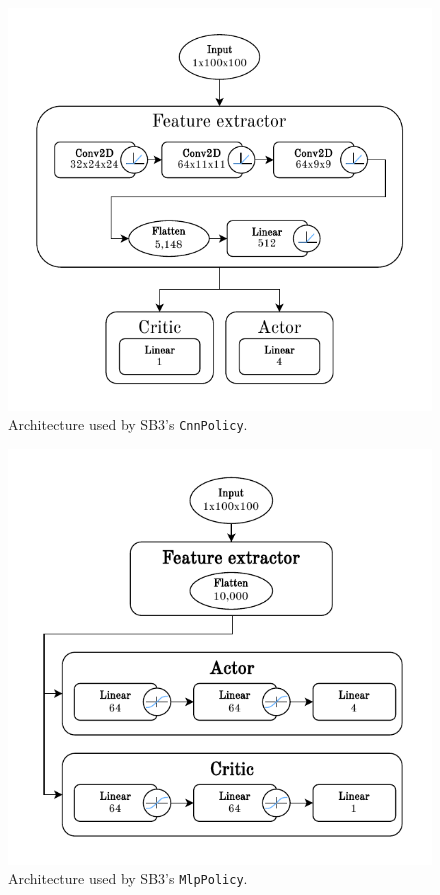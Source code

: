 \documentclass[
  digital,     %
  oneside,     %
  nosansbold,  %
  nocolorbold, %
  lof,         %
  lot,         %
]{fithesis4}
\begin{document}
\begin{figure}
    \includegraphics[width=1\linewidth]{diagrams/cnn_arch.pdf}
    \caption{Architecture used by SB3's \texttt{CnnPolicy}.}
    \label{fig:cnn_policy}
\end{figure}

\begin{figure}
    \includegraphics[width=1\linewidth]{diagrams/mlp_arch.pdf}
    \caption{Architecture used by SB3's \texttt{MlpPolicy}.}
    \label{fig:mlp_policy}
\end{figure}
\end{document}
